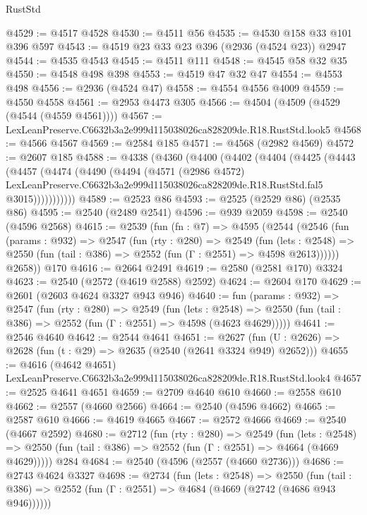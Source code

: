 \begin{lexlean}{RustStd}
\begin{coremodule}
@4529 := @4517 @4528
@4530 := @4511 @56
@4535 := @4530 @158 @33 @101 @396 @597
@4543 := @4519 @23 @33 @23 @396 (@2936 (@4524 @23)) @2947
@4544 := @4535 @4543
@4545 := @4511 @111
@4548 := @4545 @58 @32 @35
@4550 := @4548 @498 @398
@4553 := @4519 @47 @32 @47
@4554 := @4553 @498
@4556 := @2936 (@4524 @47)
@4558 := @4554 @4556 @4009
@4559 := @4550 @4558
@4561 := @2953 @4473 @305
@4566 := @4504 (@4509 (@4529 (@4544 (@4559 @4561))))
@4567 := LexLeanPreserve.C6632b3a2e999d115038026ca828209de.R18.RustStd.look5
@4568 := @4566 @4567
@4569 := @2584 @185
@4571 := @4568 (@2982 @4569)
@4572 := @2607 @185
@4588 := @4338
    (@4360
      (@4400
        (@4402
          (@4404
            (@4425
              (@4443
                (@4457
                  (@4474
                    (@4490
                      (@4494
                        (@4571
                          (@2986 @4572)
                          LexLeanPreserve.C6632b3a2e999d115038026ca828209de.R18.RustStd.fal5
                          @3015)))))))))))
@4589 := @2523 @86
@4593 := @2525 (@2529 @86) (@2535 @86)
@4595 := @2540 (@2489 @2541)
@4596 := @939 @2059
@4598 := @2540 (@4596 @2568)
@4615 := @2539
    (fun (fn : @7) =>
    @4595
      (@2544
        (@2546
          (fun (params : @932) =>
          @2547
            (fun (rty : @280) =>
            @2549
              (fun (lets : @2548) =>
              @2550 (fun (tail : @386) => @2552 (fun (Γ : @2551) => @4598 @2613))))))
        @2658))
    @170
@4616 := @2664 @2491
@4619 := @2580 (@2581 @170) @3324
@4623 := @2540 (@2572 (@4619 @2588) @2592)
@4624 := @2604 @170
@4629 := @2601 (@2603 @4624 @3327 @943 @946)
@4640 := fun (params : @932) =>
  @2547
    (fun (rty : @280) =>
    @2549
      (fun (lets : @2548) =>
      @2550 (fun (tail : @386) => @2552 (fun (Γ : @2551) => @4598 (@4623 @4629)))))
@4641 := @2546 @4640
@4642 := @2544 @4641
@4651 := @2627 (fun (U : @2626) => @2628 (fun (t : @29) => @2635 (@2540 (@2641 @3324 @949) @2652)))
@4655 := @4616 (@4642 @4651) LexLeanPreserve.C6632b3a2e999d115038026ca828209de.R18.RustStd.look4
@4657 := @2525 @4641 @4651
@4659 := @2709 @4640 @610
@4660 := @2558 @610
@4662 := @2557 (@4660 @2566)
@4664 := @2540 (@4596 @4662)
@4665 := @2587 @610
@4666 := @4619 @4665
@4667 := @2572 @4666
@4669 := @2540 (@4667 @2592)
@4680 := @2712
    (fun (rty : @280) =>
    @2549
      (fun (lets : @2548) =>
      @2550 (fun (tail : @386) => @2552 (fun (Γ : @2551) => @4664 (@4669 @4629)))))
    @284
@4684 := @2540 (@4596 (@2557 (@4660 @2736)))
@4686 := @2743 @4624 @3327
@4698 := @2734
    (fun (lets : @2548) =>
    @2550 (fun (tail : @386) => @2552 (fun (Γ : @2551) => @4684 (@4669 (@2742 (@4686 @943 @946))))))

\end{coremodule}
\end{lexlean}
